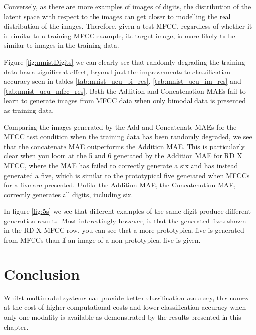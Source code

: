 Conversely, as there are more examples of images of digits, the distribution of the latent space with respect to the images can get closer to modelling the real distribution of the images. Therefore, given a test MFCC, regardless of whether it is similar to a training MFCC example, its target image, is more likely to be similar to images in the training data.


Figure \ref{fig:mnistDigits} we can clearly see that randomly degrading the training data has a significant effect, beyond just the improvements to classification accuracy seen in tables \ref{tab:mnist_ucu_bi_res}, \ref{tab:mnist_ucu_im_res} and \ref{tab:mnist_ucu_mfcc_res}. Both the Addition and Concatenation MAEs fail to learn to generate images from MFCC data when only bimodal data is presented as training data.

Comparing the images generated by the Add and Concatenate MAEs for the MFCC test condition when the training data has been randomly degraded, we see that the concatenate MAE outperforms the Addition MAE. This is particularly clear when you loom at the 5 and 6 generated by the Addition MAE for RD X MFCC, where the MAE has failed to correctly generate a six and has instead generated a five, which is similar to the prototypical five generated when MFCCs for a five are presented.
Unlike the Addition MAE, the Concatenation MAE, correctly generates all digits, including six.

In figure \ref{fig:5s} we see that different examples of the same digit produce different generation results. Most interestingly however, is that the generated fives shown in the RD X MFCC row, you can see that a more prototypical five is generated from MFCCs than if an image of a non-prototypical five is given.

\section{Conclusion}
Whilst multimodal systems can provide better classification accuracy, this comes at the cost of higher computational costs and lower classification accuracy when only one modality is available as demonstrated by the results presented in this chapter.
